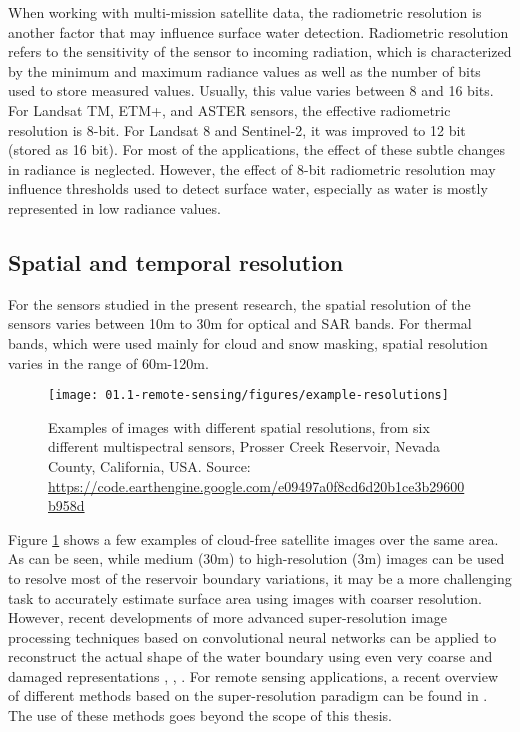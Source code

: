 When working with multi-mission satellite data, the radiometric resolution is another factor that may influence surface water detection. Radiometric resolution refers to the sensitivity of the sensor to incoming radiation, which is characterized by the minimum and maximum radiance values as well as the number of bits used to store measured values. Usually, this value varies between 8 and 16 bits. For Landsat TM, ETM+, and ASTER sensors, the effective radiometric resolution is 8-bit. For Landsat 8 and Sentinel-2, it was improved to 12 bit (stored as 16 bit). For most of the applications, the effect of these subtle changes in radiance is neglected. However, the effect of 8-bit radiometric resolution may influence thresholds used to detect surface water, especially as water is mostly represented in low radiance values.

\subsection{Spatial and temporal resolution}
For the sensors studied in the present research, the spatial resolution of the sensors varies between 10m to 30m for optical and SAR bands. For thermal bands, which were used mainly for cloud and snow masking, spatial resolution varies in the range of 60m-120m. 

\begin{figure}
	\texttt{[image: 01.1-remote-sensing/figures/example-resolutions]}
	\caption{Examples of images with different spatial resolutions, from six different multispectral sensors, Prosser Creek Reservoir, Nevada County, California, USA. Source: \url{https://code.earthengine.google.com/e09497a0f8cd6d20b1ce3b29600b958d}}
	\label{fig:example-resolutions}
\end{figure}

Figure \ref{fig:example-resolutions} shows a few examples of cloud-free satellite images over the same area. As can be seen, while medium (30m) to high-resolution (3m) images can be used to resolve most of the reservoir boundary variations, it may be a more challenging task to accurately estimate surface area using images with coarser resolution. However, recent developments of more advanced super-resolution image processing techniques based on convolutional neural networks can be applied to reconstruct the actual shape of the water boundary using even very coarse and damaged representations \citet{ledig2016photo}, \citet{shi2016real}, \citet{johnson2016perceptual}. For remote sensing applications, a recent overview of different methods based on the super-resolution paradigm can be found in \citet{garzelli2016review}. The use of these methods goes beyond the scope of this thesis.

